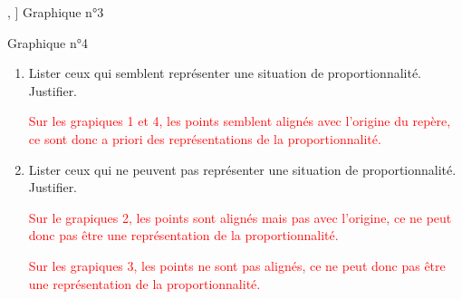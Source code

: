 \begin{corrige}
\begin{multicols}{2}
\begin{center}
{{                    },%
                ]{}
            }
            {\sc Graphique n°3}
            \par\medskip\par
            \scalebox{0.5}{
                \Fonction[%
                    Trace,%
                    Xmin=0,Xmax=5,Xstep=2,%
                    Ymin=0,Ymax=5,Ystep=2,%
                    Origine={(0,0)},%
                    Grille,PasGrilleX=0.5,PasGrilleY=0.5,%
                    Bornea=0,Borneb=0,%
                    Traces={
                            marque_p:="croix";
                            pointe(placepoint(2,1.5),placepoint(4,3),placepoint(6,4.5),placepoint(10,7.5),);
                    },%
                ]{}
            }
            {\sc Graphique n°4}
        \end{center}
    \end{multicols}
    \Coupe
    \begin{enumerate}
        \item Lister ceux qui semblent représenter une situation de proportionnalité. Justifier.
        \par\textcolor{red}{Sur les grapiques 1 et 4, les points semblent alignés avec l'origine du repère, ce sont donc a priori des représentations de la proportionnalité.}
        \item Lister ceux qui ne peuvent pas représenter une situation de proportionnalité. Justifier.
        \par\textcolor{red}{Sur le grapiques 2, les points sont alignés mais pas avec l'origine, ce ne peut donc pas être une représentation de la proportionnalité.}
        \par\textcolor{red}{Sur les grapiques 3, les points ne sont pas alignés, ce ne peut donc pas être une représentation de la proportionnalité.}
    \end{enumerate}
\end{corrige}

